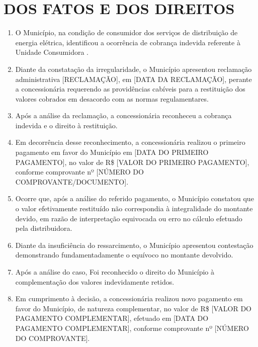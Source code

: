 \newcommand{\tipoRequerimento}{Solicitação de reconhecimento e pagamento de valores complementares decorrentes de cobrança indevida}
\newcommand{\tese}{CORREÇÃO MONETÁRIA E JUROS DE PAGAMENTO}

\section{DOS FATOS E DOS DIREITOS}

\begin{enumerate}[resume]
    \item O Município, na condição de consumidor dos serviços de distribuição de energia elétrica, identificou a ocorrência de cobrança indevida referente à Unidade Consumidora \unidadeConsumidora{}.   

    \item Diante da constatação da irregularidade, o Município apresentou reclamação administrativa [RECLAMAÇÃO], em [DATA DA RECLAMAÇÃO], perante a concessionária requerendo as providências cabíveis para a restituição dos valores cobrados em desacordo com as normas regulamentares.

    \item Após a análise da reclamação, a concessionária reconheceu a cobrança indevida e o direito à restituição.

    \item Em decorrência desse reconhecimento, a concessionária realizou o primeiro pagamento em favor do Município em [DATA DO PRIMEIRO PAGAMENTO], no valor de R\$ [VALOR DO PRIMEIRO PAGAMENTO], conforme comprovante nº [NÚMERO DO COMPROVANTE/DOCUMENTO].

    \item Ocorre que, após a análise do referido pagamento, o Município constatou que o valor efetivamente restituído não correspondia à integralidade do montante devido, em razão de interpretação equivocada ou erro no cálculo efetuado pela distribuidora.

    \item Diante da insuficiência do ressarcimento, o Município apresentou contestação demonstrando fundamentadamente o equívoco no montante devolvido.

    \item Após a análise do caso, Foi reconhecido o direito do Município à complementação dos valores indevidamente retidos.

    \item Em cumprimento à decisão, a concessionária realizou novo pagamento em favor do Município, de natureza complementar, no valor de R\$ [VALOR DO PAGAMENTO COMPLEMENTAR], efetuado em [DATA DO PAGAMENTO COMPLEMENTAR], conforme comprovante nº [NÚMERO DO COMPROVANTE].


\end{enumerate}
